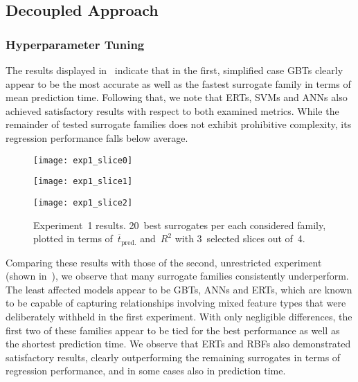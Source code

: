\subsection{Decoupled Approach}
\label{sec:modelres}

\subsubsection{Hyperparameter Tuning}
\label{sec:res-exp12}

The results displayed in~ indicate that in the first,
simplified case GBTs clearly appear to be the most accurate as
well as the fastest surrogate family in terms of mean prediction time. Following
that, we note that ERTs, SVMs and ANNs also achieved satisfactory results with respect to both examined metrics.
While the remainder of tested surrogate families does not exhibit prohibitive
complexity, its regression performance falls below average.

\begin{figure}
	\centering
	\hspace*{-0.1\columnwidth}
	\texttt{[image: exp1\_slice0]}

	\vfill

	\hspace*{-0.1\columnwidth}
	\texttt{[image: exp1\_slice1]}

	\vfill

	\hspace*{-0.1\columnwidth}
	\texttt{[image: exp1\_slice2]}

	\caption{\label{fig:exp1-time-vs-reg}Experiment~1 results. 20~best surrogates per each considered family, plotted in
		terms of~$\overline{t}_{\text{pred.}}$ and~$R^2$ with 3~selected slices out
		of~4.}
\end{figure}

Comparing these results with those of the second, unrestricted experiment (shown
in~), we observe that many surrogate families
consistently underperform. The least
affected models appear to be GBTs, ANNs and ERTs, which are known to be capable of capturing relationships
involving mixed feature types that were deliberately withheld in the first
experiment. With only negligible differences, the first two of these families
appear to be tied for the best performance as well as the shortest prediction
time. We observe that ERTs and RBFs also
demonstrated satisfactory results, clearly outperforming the remaining surrogates in
terms of regression performance, and in some cases also in prediction time.

